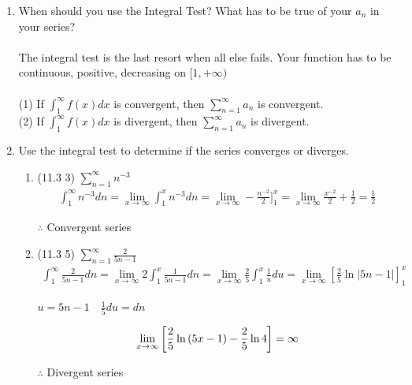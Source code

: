 \documentclass[12pt]{article}
\begin{document}
\begin{enumerate}
    \addtocounter{enumi}{13}\item When should you use the Integral Test? What has to be true of your $a_n$ in your series?
    \\\\The integral test is the last resort when all else fails. Your function has to be continuous, positive, decreasing on $[1, +\infty)$\\
    \\(1) If $\int_1^\infty f(x)dx$ is convergent, then $\sum_{n=1}^\infty a_n$ is convergent.
    \\(2) If $\int_1^\infty f(x)dx$ is divergent, then $\sum_{n=1}^\infty a_n$ is divergent.

    \item Use the integral test to determine if the series converges or diverges.
    \begin{enumerate}
        \item (11.3 3) $\sum_{n=1}^\infty n^{-3}$
            \begin{align*}
                \int_1^\infty n^{-3}dn = \lim_{x\to\infty}\int_1^x n^{-3}dn= \lim_{x\to\infty}-\frac{n^{-2}}{2} \bigg]^x_1=\lim_{x\to\infty}\frac{x^{-2}}{2}+\frac{1}{2}=\frac{1}{2}
            \end{align*}
            \begin{center}
            $\therefore$ Convergent series    
            \end{center}
        \item (11.3 5) $\sum_{n=1}^\infty\frac{2}{5n-1}$
        \begin{align*}
             \int_1^\infty \frac{2}{5n-1}dn=\lim_{x\to\infty}2\int_1^x \frac{1}{5n-1}dn=\lim_{x\to\infty}\frac{2}{5}\int_1^x \frac{1}{u}du=\lim_{x\to\infty}\left[\frac{2}{5}\ln|5n-1|\right]_1^x
        \end{align*}
        \begin{center}
            $u = 5n-1 \quad \frac{1}{5}du = dn$ \\
        \end{center}
        \begin{equation*}
             \lim_{x\to\infty}\left[\frac{2}{5}\ln{(5x-1)}-\frac{2}{5}\ln{4}\right]=\infty\\
        \end{equation*}
        \begin{center}
            $\therefore$  Divergent series
        \end{center}

\end{enumerate}
\end{enumerate}
\end{document}
